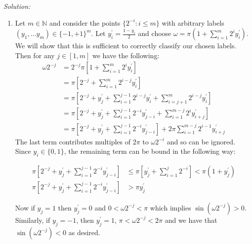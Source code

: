 \documentclass[
	10pt, %
	a4paper, %
	oneside, %
	headinclude,footinclude, %
	BCOR5mm, %
]{scrartcl}
\newenvironment{solution}
{\textit{Solution:}}
{}
\begin{document}
\begin{solution}
\begin{enumerate}[label= (\alph*)]
		\item Let $m \in \mathbb{N}$ and consider the points $\{2^{-i}: i \leq m\}$ with arbitrary labels $(y_1, \ldots y_{m}) \in {\{-1, +1\}}^m$. Let $y_i^\prime = \frac{1-y_i}{2}$ and choose $\omega = \pi(1 + \sum_{i=1}^m 2^{i}y_i^\prime)$. We will show that this is sufficient to correctly classify our chosen labels. Then for any $j\in[1,m]$ we have the following:
		      \begin{align*}
			      \omega 2^{-j} & = 2^{-j} \pi\left[1 + \sum_{i=1}^m 2^{i}y_i^\prime\right]                                                                    \\
			                    & = \pi \left[2^{-j} + \sum_{i=1}^m 2^{i-j}y_i^\prime\right]                                                                   \\
			                    & = \pi \left[2^{-j} + y_j^\prime + \sum_{i=1}^{j-1} 2^{i-j}y_i^\prime + \sum_{i=j+1}^m 2^{i-j}y_i^\prime \right]              \\
			                    & = \pi \left[2^{-j} + y_j^\prime + \sum_{i=1}^{j-1} 2^{-i}y_{j-i}^\prime + \sum_{i=1}^{m-j} 2^i y_{i+j}^\prime \right]        \\
			                    & = \pi \left[2^{-j} + y_j^\prime + \sum_{i=1}^{j-1} 2^{-i}y_{j-i}^\prime\right] + 2\pi \sum_{i=1}^{m-j} 2^{i-1}y_{i+j}^\prime
		      \end{align*}
		      The last term contributes multiples of $2\pi$ to $\omega 2^{-i}$ and so can be ignored. Since $y_i\in\{0,1\}$, the remaining term can be bound in the following way:

		      \begin{align*}
			      \pi \left[2^{-j} + y_j^\prime + \sum_{i=1}^{j-1} 2^{-i}y_{j-i}^\prime\right] & \leq \pi \left[ y_j^\prime + \sum_{i=1}^{j} 2^{-i}\right] < \pi(1 + y_j^\prime) \\
			      \pi \left[2^{-j} + y_j^\prime + \sum_{i=1}^{j-1} 2^{-i}y_{j-i}^\prime\right] & > \pi y_j^\prime
		      \end{align*}

		      Now if $y_j = 1$ then $y_j^\prime = 0$ and $0 < \omega 2^{-j} < \pi$ which implies $\sin(\omega 2^{-j}) > 0$. Similarly, if $y_j = -1$, then $y_j^\prime = 1$, $\pi < \omega 2^{-j} < 2\pi$ and we have that $\sin(\omega 2^{-j}) < 0$ as desired.

	\end{enumerate}
\end{solution}
\end{document}

